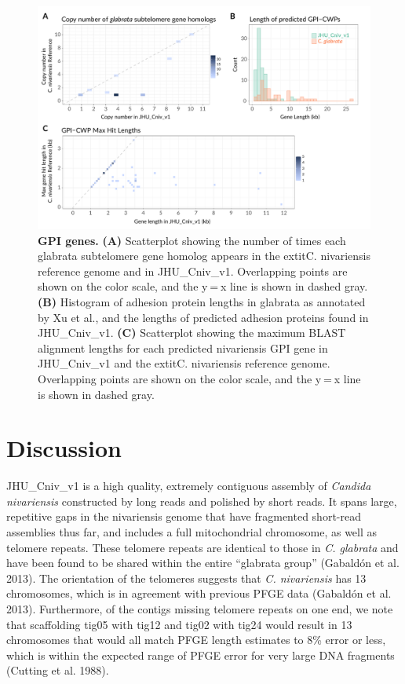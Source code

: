 \begin{figure}[!ht]
\centering
\includegraphics[width = 1\linewidth,keepaspectratio]{figure/gpicwps.pdf}
\caption[GPI genes]{{\bf GPI genes.} {\bf (A)} Scatterplot showing the number of times each glabrata subtelomere gene homolog appears in the 	extit{C. nivariensis} reference genome and in JHU\_Cniv\_v1. Overlapping points are shown on the color scale, and the y = x line is shown in dashed gray. {\bf (B)} Histogram of adhesion protein lengths in glabrata as annotated by Xu et al., and the lengths of predicted adhesion proteins found in JHU\_Cniv\_v1. {\bf (C)} Scatterplot showing the maximum BLAST alignment lengths for each predicted nivariensis GPI gene in JHU\_Cniv\_v1 and the 	extit{C. nivariensis} reference genome. Overlapping points are shown on the color scale, and the y = x line is shown in dashed gray. }
\label{fig:gpicwps}
\end{figure}



\section{Discussion}
\label{sec:discuss}

JHU\_Cniv\_v1 is a high quality, extremely contiguous assembly of \textit{Candida nivariensis} constructed by long reads and polished by short reads. It spans large, repetitive gaps in the nivariensis genome that have fragmented short-read assemblies thus far, and includes a full mitochondrial chromosome, as well as telomere repeats. These telomere repeats are identical to those in \textit{C. glabrata} and have been found to be shared within the entire “glabrata group” (Gabaldón et al. 2013). The orientation of the telomeres suggests that \textit{C. nivariensis} has 13 chromosomes, which is in agreement with previous PFGE data (Gabaldón et al. 2013). Furthermore, of the contigs missing telomere repeats on one end, we note that scaffolding tig05 with tig12 and tig02 with tig24 would result in 13 chromosomes that would all match PFGE length estimates to 8\% error or less, which is within the expected range of PFGE error for very large DNA fragments (Cutting et al. 1988).

